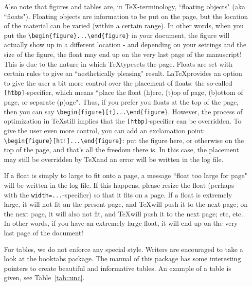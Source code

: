 \documentclass[12pt]{article}
\begin{document}
Also note that figures and tables are, in \TeX-terminology, ``floating objects" (aka ``floats"). Floating objects are information to be put on the page, but the location of the material can be varied (within a certain range). In other words, when you put the \verb|\begin{figure}...\end{figure}| in your document, the figure will actually show up in a different location - and depending on your settings and the size of the figure, the float may end up on the very last page of the manuscript! This is due to the nature in which \TeX typesets the page. Floats are set with certain rules to give an ``aesthetically pleasing" result. \LaTeX provides an option to give the user a bit more control over the placement of floats: the so-called \verb|[htbp]|-specifier, which means ``place the float (h)ere, (t)op of page, (b)ottom of page, or separate (p)age". Thus, if you prefer you floats at the top of the page, then you can say \verb|\begin{figure}[t]...\end{figure}|. However, the process of optimization in \TeX still implies that the \verb|[htbp]|-specifier can be overridden. To give the user even more control, you can add an exclamation point: \verb|\begin{figure}[ht!]...\end{figure}|: put the figure here, or otherwise on the top of the page, and that's all the freedom there is. In this case, the placement may still be overridden by \TeX and an error will be written in the log file.

If a float is simply to large to fit onto a page, a message ``float too large for page" will be written in the log file. If this happens, please resize the float (perhaps with the \verb|width=...|-specifier) so that it fits on a page. If a float is extremely large, it will not fit an the present page, and \TeX will push it to the next page; on the next page, it will also not fit, and \TeX will push it to the next page; etc, etc.. In other words, if you have an extremely large float, it will end up on the very last page of the document!

For tables, we do not enforce any special style. Writers are encouraged to take a look at the booktabs package. The manual of this package has some interesting pointers to create beautiful and informative tables. An example of a table is given, see Table~\ref{tab::unc}.
\end{document}
